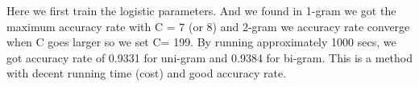 
Here we first train the logistic parameters. And we found in 1-gram we got the maximum accuracy rate with C = 7 (or 8) and 2-gram we accuracy rate converge when C goes larger so we set C= 199. By running approximately 1000 secs, we got accuracy rate of 0.9331 for uni-gram and 0.9384 for bi-gram. This is a method with decent running time (cost) and  good accuracy rate. \\